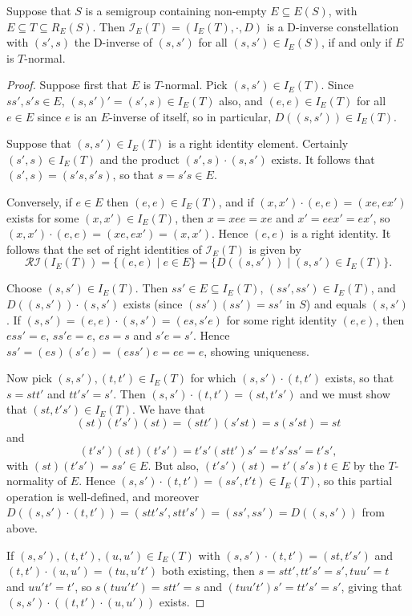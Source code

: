 \documentclass[10pt,a4paper]{amsart}
\begin{document}
\begin{thm}  \label{invconsteg}
Suppose that $S$ is a semigroup containing non-empty $E\subseteq E(S)$, with $E\subseteq T\subseteq R_E(S)$. Then $\mathcal{I}_E(T)=(I_E(T),\cdot,D)$ is a D-inverse constellation with $(s',s)$ the D-inverse of $(s,s')$ for all $(s,s')\in I_E(S)$, if and only if $E$ is $T$-normal.
\end{thm}

\begin{proof}
Suppose first that $E$ is $T$-normal. Pick $(s,s')\in I_E(T)$.  Since $ss',s's\in E$, $(s,s')'=(s',s)\in I_E(T)$ also, and $(e,e)\in I_E(T)$ for all $e\in E$ since $e$ is an $E$-inverse of itself, so in particular, $D((s,s'))\in I_E(T)$. 

Suppose that $(s,s')\in I_E(T)$ is a right identity element. Certainly  
$(s',s)\in I_E(T)$ and the product $(s',s)\cdot (s,s')$ exists. It follows
that $(s',s)=(s's, s's)$, so that $s=s's\in E$.

Conversely, if $e\in E$ then $(e,e)\in I_E(T)$, and if $(x,x')\cdot (e,e)=(xe,ex')$ exists for some $(x,x')\in I_E(T)$, then $x=xee=xe$ and $x'=eex'=ex'$, so $(x,x')\cdot (e,e)=(xe,ex')=(x,x')$.  Hence $(e,e)$ is a right identity. It follows that the set of right identities of $\mathcal{I}_E(T)$ is given by
 \[\mathcal{RI}(I_E(T))=\{(e,e)\mid e\in E\}=\{D((s,s'))\mid (s,s')\in I_E(T)\}.\]

Choose $(s,s')\in I_E(T)$.  Then $ss'\in E\subseteq I_E(T)$, $(ss',ss')\in I_E(T)$, and  $D((s,s'))\cdot (s,s')$ exists (since $(ss')(ss')=ss'$ in $S$) and equals $(s,s')$.  If $(s,s')=(e,e)\cdot (s,s')=(es,s'e)$ for some right identity $(e,e)$, then $ess'=e$, $ss'e=e$, $es=s$ and $s'e=s'$. Hence $ss'=(es)(s'e)=(ess')e=ee=e$, showing uniqueness.

Now pick $(s,s'),(t,t')\in I_E(T)$ for which $(s,s')\cdot (t,t')$ exists,
so that $s=stt'$ and $tt's'=s'$.  Then $(s,s')\cdot (t,t')=(st,t's')$ and we must show that $(st,t's')\in I_E(T)$. We have that $$(st)(t's')(st)=(stt')(s'st)=s(s'st)=st$$ and $$(t's')(st)(t's')=t's'(stt')s'=t's'ss'=t's',$$ with $(st)(t's')=ss'\in E$.  But also, $(t's')(st)=t'(s's)t\in E$ by the $T$-normality of $E$.  Hence $(s,s')\cdot (t,t')=(ss',t't)\in  I_E(T)$, so this partial operation is well-defined, and moreover $D((s,s')\cdot (t,t'))=(stt's',stt's')=(ss',ss')=D((s,s'))$ from above.

If $(s,s'),(t,t'),(u,u')\in I_E(T)$ with $(s,s')\cdot (t,t')=(st,t's')$ and $(t,t')\cdot (u,u')=(tu,u't')$ both existing, then $s=stt', tt's'=s', tuu'=t$ and $ uu't'=t'$, so $s(tuu't')=stt'=s$ and $(tuu't')s'=tt's'=s'$, giving that $(s,s')\cdot ((t,t')\cdot (u,u'))$ exists.    


\end{proof}
\end{document}
